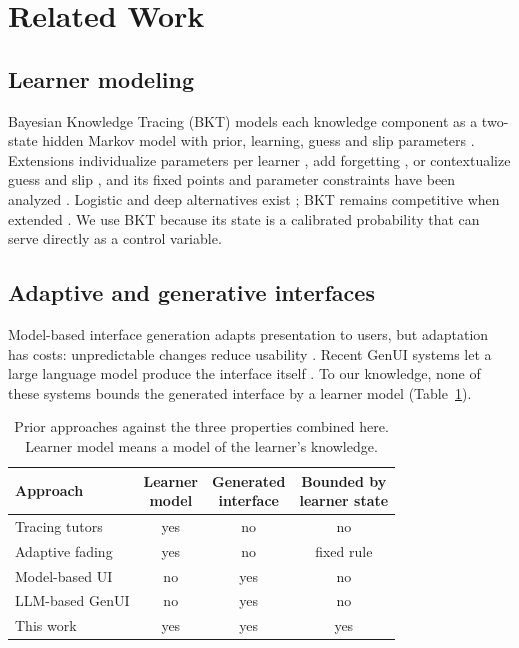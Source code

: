 \documentclass[conference]{IEEEtran}
\begin{document}
\section{Related Work}

\subsection{Learner modeling}
Bayesian Knowledge Tracing (BKT) models each knowledge component as a
two-state hidden Markov model with prior, learning, guess and slip parameters
\cite{corbett1995knowledge}. Extensions individualize parameters per learner
\cite{pardos2010individualization}, add forgetting \cite{khajah2016deep},
or contextualize guess and slip \cite{baker2008contextual}, and its
fixed points and parameter constraints have been analyzed
\cite{vandesande2013properties}. Logistic and deep alternatives exist
\cite{pelanek2017bkt}; BKT remains competitive when extended
\cite{khajah2016deep}. We use BKT because its state is a
calibrated probability that can serve directly as a control variable.

\subsection{Adaptive and generative interfaces}
Model-based interface generation \cite{gajos2010supple} adapts presentation to users, but
adaptation has costs: unpredictable changes reduce usability
\cite{gajos2008predictability,findlater2004menus}. Recent GenUI
systems let a large language model produce the interface itself
\cite{leviathan2026genui,tu2026maicui}. To our knowledge, none of these
systems bounds the generated interface by a learner model
(Table~\ref{tab:related}).

\begin{table}[t]
\caption{Prior approaches against the three properties combined here. Learner model means a model of the learner's knowledge.}
\label{tab:related}
\centering\footnotesize
\setlength{\tabcolsep}{3pt}
\begin{tabular}{@{}lccc@{}}
\toprule
Approach & \makecell{Learner\\model} & \makecell{Generated\\interface} & \makecell{Bounded by\\learner state}\\
\midrule
Tracing tutors \cite{corbett1995knowledge,ritter2007cognitive} & yes & no & no\\
Adaptive fading \cite{salden2010expertise} & yes & no & fixed rule\\
Model-based UI \cite{gajos2010supple} & no & yes & no\\
LLM-based GenUI \cite{leviathan2026genui,tu2026maicui} & no & yes & no\\
This work & yes & yes & yes\\
\bottomrule
\end{tabular}
\end{table}
\end{document}
